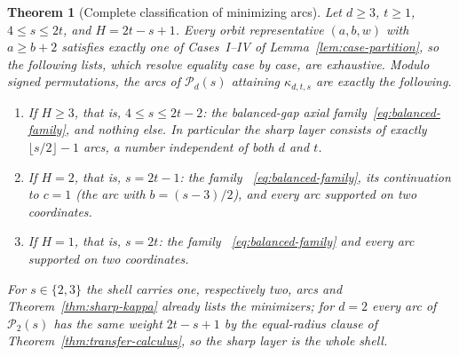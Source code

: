 \documentclass[pdflatex,sn-mathphys-num]{sn-jnl}
\theoremstyle{thmstyleone}
\newtheorem{theorem}{Theorem}[section]
\theoremstyle{thmstylethree}
\theoremstyle{thmstyletwo}
\begin{document}
\begin{theorem}[Complete classification of minimizing arcs]
\label{thm:arc-classification}
Let $d\ge3$, $t\ge1$, $4\le s\le2t$, and $H=2t-s+1$.  Every orbit
representative $(a,b,w)$ with $a\ge b+2$ satisfies exactly one of
Cases~I--IV of Lemma~\ref{lem:case-partition}, so the following lists,
which resolve equality case by case, are exhaustive.  Modulo signed
permutations, the arcs of $\mathcal P_d(s)$ attaining $\kappa_{d,t,s}$ are
exactly the following.
\begin{enumerate}
\item[\textup{(i)}] If $H\ge3$, that is, $4\le s\le2t-2$: the balanced-gap
axial family~\eqref{eq:balanced-family}, and nothing else.  In particular
the sharp layer consists of exactly $\lfloor s/2\rfloor-1$ arcs, a number
independent of both $d$ and $t$.
\item[\textup{(ii)}] If $H=2$, that is, $s=2t-1$: the family
~\eqref{eq:balanced-family}, its continuation to $c=1$
(the arc with $b=(s-3)/2$), and every arc supported on two coordinates.
\item[\textup{(iii)}] If $H=1$, that is, $s=2t$: the family
~\eqref{eq:balanced-family} and every arc supported on two coordinates.
\end{enumerate}
For $s\in\{2,3\}$ the shell carries one, respectively two, arcs and
Theorem~\ref{thm:sharp-kappa} already lists the minimizers; for $d=2$ every
arc of $\mathcal P_2(s)$ has the same weight $2t-s+1$ by the equal-radius
clause of Theorem~\ref{thm:transfer-calculus}, so the sharp layer is the
whole shell.
\end{theorem}
\end{document}
